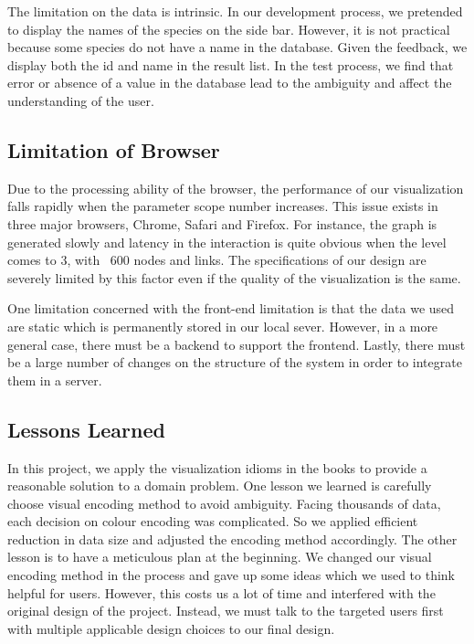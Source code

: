 \documentclass[journal]{vgtc}                %
\begin{document}
The limitation on the data is intrinsic.  In our development process, we pretended to display the names of the species on the side bar. However, it is not practical because some species do not have a name in the database. Given the feedback, we display both the id and name in the result list. In the test process, we find that error or absence of a value in the database lead to the ambiguity and affect the understanding of the user. 

\subsection{Limitation of Browser}
Due to the processing ability of the browser, the performance of our visualization falls rapidly when the parameter scope number increases.  This issue exists in three major browsers, Chrome, Safari and Firefox. For instance, the graph is generated slowly and latency in the interaction is quite obvious when the level comes to 3, with ~600 nodes and links. The specifications of our design are severely limited by this factor even if the quality of the visualization is the same. 

One limitation concerned with the front-end limitation is that the data we used are static which is permanently stored in our local sever. However, in a more general case, there must be a backend to support the frontend. Lastly, there must be a large number of changes on the structure of the system in order to integrate them in a server.

\subsection{Lessons Learned}
In this project, we apply the visualization idioms in the books to provide a reasonable solution to a domain problem. One lesson we learned is carefully choose visual encoding method to avoid ambiguity. Facing thousands of data, each decision on colour encoding was complicated. So we applied efficient reduction in data size and adjusted the encoding method accordingly. The other lesson is to have a meticulous plan at the beginning. We changed our visual encoding method in the process and gave up some ideas which we used to think helpful for users. However, this costs us a lot of time and interfered with the original design of the project. Instead, we must talk to the targeted users first with multiple applicable design choices to our final design. 
\end{document}
